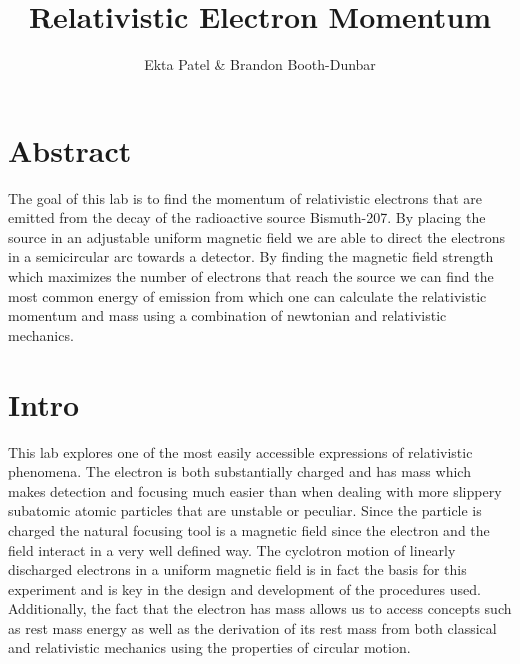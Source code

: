 



\newcommand{\ig}[2][width=4in]{\texttt{[image: \#2]}}    		
\usepackage{graphicx}					
\usepackage{amssymb}
\usepackage{pgfplotstable}
\usepackage{float}
\usepackage{caption}
\captionsetup[table]{justification=justified,singlelinecheck=false, position=bottom}


\header {\today}							
\title{Relativistic Electron Momentum}
\author{Ekta Patel \& Brandon Booth-Dunbar}



\section{Abstract}
\begin{em}
The goal of this lab is to find the momentum of relativistic electrons that are emitted from the decay of the radioactive source Bismuth-207.  By placing the source in an adjustable uniform magnetic field we are  able to direct the electrons in a semicircular arc towards a detector.  By finding the magnetic field strength which maximizes the number of electrons that reach the source we can find the most common energy of emission from which one can calculate the relativistic  momentum and mass using a combination of newtonian and relativistic mechanics. 
\end{em}

\section{Intro}
This lab explores one of the most easily accessible expressions of relativistic phenomena. The electron is both substantially charged and has mass which makes detection and focusing much  easier than when dealing with more slippery subatomic  atomic particles that are unstable or peculiar.  Since the particle is charged the natural focusing tool is a magnetic field since the electron and the field interact in a very well defined way. The cyclotron motion of linearly discharged electrons in a uniform magnetic field is in fact the basis for this experiment and is key in the design and development of the procedures used. Additionally, the fact that the electron has mass allows us to access concepts such as rest mass energy as well as the derivation of its rest mass from both classical and relativistic mechanics using the properties of circular motion.  

